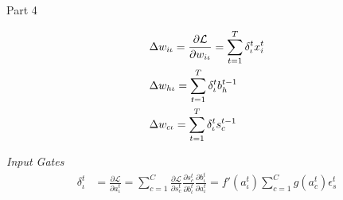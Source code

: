 \documentclass[UTF8]{article}
\begin{document}
        Part 4

        \begin{align}
        & \Delta w_{i\iota} = \frac{\partial \mathcal{L}}{\partial w_{i\iota}}
        = \sum_{t=1}^T \delta_\iota^t x_i^t \notag \\
        & \Delta w_{h\iota} = \sum_{t=1}^T \delta_\iota^t b_h^{t-1} \notag \\
        & \Delta w_{c\iota} = \sum_{t=1}^T \delta_\iota^t s_c^{t-1} \notag 
        \end{align}
        
        \emph{Input Gates}
        \begin{align}
        \delta_\iota^t &= \frac{\partial \mathcal{L}}{\partial a_\iota^t}
        = \sum_{c=1}^C \frac{\partial \mathcal{L}}{\partial s_c^t} \frac{\partial s_c^t}{\partial b_\iota^t} \frac{\partial b_\iota^t}{\partial a_\iota^t}
        = f'(a_\iota^t) \sum_{c=1}^C g(a_c^{t}) \epsilon_s^t
        \end{align}
\end{document}
